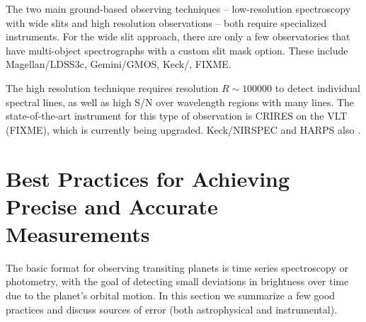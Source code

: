 \documentclass[graybox,natbib,nosecnum]{svmult}
\begin{document}
The two main ground-based observing techniques -- low-resolution spectroscopy with wide slits and high resolution observations -- both require specialized instruments. For the wide slit approach, there are only a few observatories that have multi-object spectrographs with a custom slit mask option. These include Magellan/LDSS3c, Gemini/GMOS, Keck/, FIXME.  

The high resolution technique requires resolution $R\sim100000$ to detect individual spectral lines, as well as high S/N over wavelength regions with many lines. The state-of-the-art instrument for this type of observation is CRIRES on the VLT (FIXME), which is currently being upgraded.  Keck/NIRSPEC and HARPS also \citep{lockwood14, martins15}.

\section{Best Practices for Achieving Precise and Accurate Measurements}
\label{sec:fits}
The basic format for observing transiting planets is time series spectroscopy or photometry, with the goal of detecting small deviations in brightness over time due to the planet's orbital motion.  In this section we summarize a few good practices and discuss sources of error (both astrophysical and instrumental).


\end{document}
